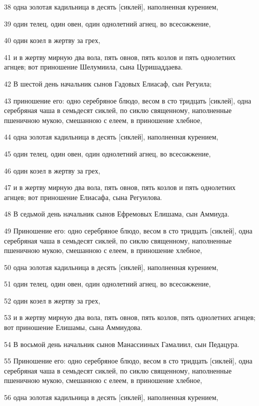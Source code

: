 \par 38 одна золотая кадильница в десять [сиклей], наполненная курением,
\par 39 один телец, один овен, один однолетний агнец, во всесожжение,
\par 40 один козел в жертву за грех,
\par 41 и в жертву мирную два вола, пять овнов, пять козлов и пять однолетних агнцев; вот приношение Шелумиила, сына Цуришаддаева.
\par 42 В шестой день начальник сынов Гадовых Елиасаф, сын Регуила;
\par 43 приношение его: одно серебряное блюдо, весом в сто тридцать [сиклей], одна серебряная чаша в семьдесят сиклей, по сиклю священному, наполненные пшеничною мукою, смешанною с елеем, в приношение хлебное,
\par 44 одна золотая кадильница в десять [сиклей], наполненная курением,
\par 45 один телец, один овен, один однолетний агнец, во всесожжение,
\par 46 один козел в жертву за грех,
\par 47 и в жертву мирную два вола, пять овнов, пять козлов и пять однолетних агнцев; вот приношение Елиасафа, сына Регуилова.
\par 48 В седьмой день начальник сынов Ефремовых Елишама, сын Аммиуда.
\par 49 Приношение его: одно серебряное блюдо, весом в сто тридцать [сиклей], одна серебряная чаша в семьдесят сиклей, по сиклю священному, наполненные пшеничною мукою, смешанною с елеем, в приношение хлебное,
\par 50 одна золотая кадильница в десять [сиклей], наполненная курением,
\par 51 один телец, один овен, один однолетний агнец, во всесожжение,
\par 52 один козел в жертву за грех,
\par 53 и в жертву мирную два вола, пять овнов, пять козлов, пять однолетних агнцев; вот приношение Елишамы, сына Аммиудова.
\par 54 В восьмой день начальник сынов Манассииных Гамалиил, сын Педацура.
\par 55 Приношение его: одно серебряное блюдо, весом в сто тридцать [сиклей], одна серебряная чаша в семьдесят сиклей, по сиклю священному, наполненные пшеничною мукою, смешанною с елеем, в приношение хлебное,
\par 56 одна золотая кадильница в десять [сиклей], наполненная курением,
